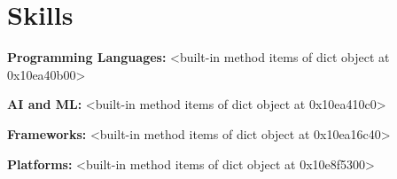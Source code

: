 \section{Skills}

    \begin{onecolentry}
        \textbf{Programming Languages:} <built-in method items of dict object at 0x10ea40b00>
    \end{onecolentry}

    \vspace{0.05 cm}

    \begin{onecolentry}
        \textbf{AI and ML:} <built-in method items of dict object at 0x10ea410c0>
    \end{onecolentry}

    \vspace{0.05 cm}

    \begin{onecolentry}
        \textbf{Frameworks:} <built-in method items of dict object at 0x10ea16c40>
    \end{onecolentry}

    \vspace{0.05 cm}

    \begin{onecolentry}
        \textbf{Platforms:} <built-in method items of dict object at 0x10e8f5300>
    \end{onecolentry}

    \vspace{0.05 cm}

